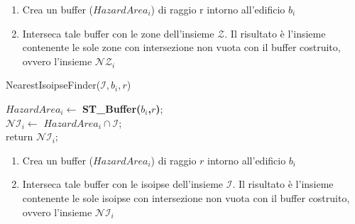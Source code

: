 \begin{enumerate}
	\item Crea un buffer ($ HazardArea_i $) di raggio r intorno all'edificio $b_i$
	\item Interseca tale buffer con le zone dell’insieme $\mathcal{Z}$. Il risultato è l’insieme contenente le sole zone con intersezione non vuota con il buffer costruito, ovvero l’insieme  $\mathcal{NZ}_i$
\end{enumerate}

\begin{algorithm}[H]
	
	
	\IncMargin{1em}
	\caption{NearestIsoipseFinder($\mathcal{I},b_i,r$)}
	\label{alg:two}
	\BlankLine
	\SetAlgoNoLine
	$  HazardArea_i   \leftarrow $ \textbf{ST\_Buffer($b_i$,$r$)}; \\
	$ \mathcal{NI}_i \leftarrow $ $HazardArea_i \cap \mathcal{I} $; \\
	return $\mathcal{NI}_i;$
\end{algorithm}
\begin{enumerate}
	\item Crea un buffer ($ HazardArea_i $) di raggio $r$ intorno all'edificio $b_i$
	\item Interseca tale buffer con le isoipse dell’insieme $\mathcal{I}$. Il risultato è l’insieme contenente le sole isoipse con intersezione non vuota con il buffer costruito, ovvero l’insieme  $\mathcal{NI}_i$
\end{enumerate}

